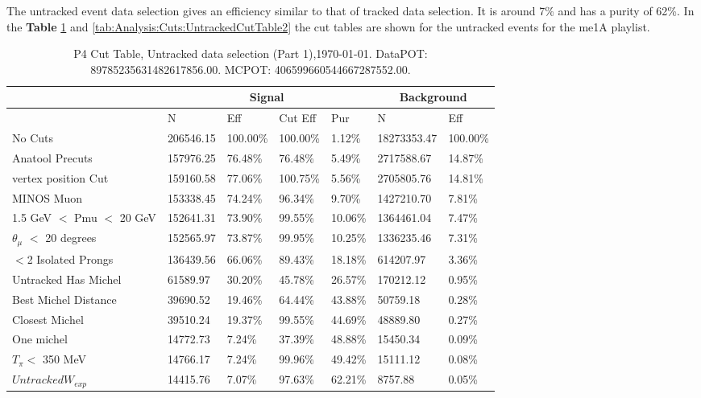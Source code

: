 The untracked event data selection gives an efficiency similar to that of tracked data selection. It is around 7\% and has a purity of 62\%. In the \textbf{Table} \ref{tab:Analysis:Cuts:UntrackedCutTable1} and \ref{tab:Analysis:Cuts:UntrackedCutTable2} the cut tables are shown for the untracked events for the me1A playlist. 

\begin{table}[!hbt]
    \tiny
    \centering
    \begin{tabular}{|*{7}{l|}}


    \hline
    & \multicolumn{4}{c|}{Signal} & \multicolumn{2}{c|}{Background} \\
    \hline
& N     & Eff     & Cut Eff & Pur    & N         & Eff   \\\hline
 No Cuts    & 206546.15     & 100.00\% & 100.00\% &   1.12\% & 18273353.47 & 100.00\%  \\ \hline
 Anatool Precuts   & 157976.25     &  76.48\% &  76.48\% &   5.49\% & 2717588.67 &  14.87\%   \\ \hline
 vertex position Cut  & 159160.58     &  77.06\% & 100.75\% &   5.56\% & 2705805.76 &  14.81\%  \\ \hline
 MINOS Muon  & 153338.45     &  74.24\% &  96.34\% &   9.70\% & 1427210.70 &   7.81\%  \\ \hline
 1.5 GeV $<$ Pmu $<$ 20 GeV   & 152641.31     &  73.90\% &  99.55\% &  10.06\% & 1364461.04 &   7.47\% \\ \hline
 $\theta_{\mu}$ $<$ 20 degrees   & 152565.97     &  73.87\% &  99.95\% &  10.25\% & 1336235.46 &   7.31\%  \\ \hline
 $<$2 Isolated Prongs   & 136439.56     &  66.06\% &  89.43\% &  18.18\% & 614207.97 &   3.36\%  \\ \hline
 Untracked Has Michel   & 61589.97     &  30.20\% &  45.78\% &  26.57\% & 170212.12 &   0.95\% \\ \hline
 Best Michel Distance   & 39690.52     &  19.46\% &  64.44\% &  43.88\% & 50759.18 &   0.28\% \\ \hline
 Closest Michel   & 39510.24     &  19.37\% &  99.55\% &  44.69\% & 48889.80 &   0.27\% \\ \hline
 One michel   & 14772.73     &   7.24\% &  37.39\% &  48.88\% & 15450.34 &   0.09\%  \\ \hline
 $T_\pi<$ 350 MeV   & 14766.17     &   7.24\% &  99.96\% &  49.42\% & 15111.12 &   0.08\% \\ \hline
 $Untracked W_{exp}$   & 14415.76     &   7.07\% &  97.63\% &  62.21\% & 8757.88 &   0.05\%  \\ \hline
    \end{tabular}
    \caption{P4 Cut Table, Untracked data selection (Part 1),\today. DataPOT: 89785235631482617856.00. MCPOT: 406599660544667287552.00.}
    \label{tab:Analysis:Cuts:UntrackedCutTable1}
\end{table}

